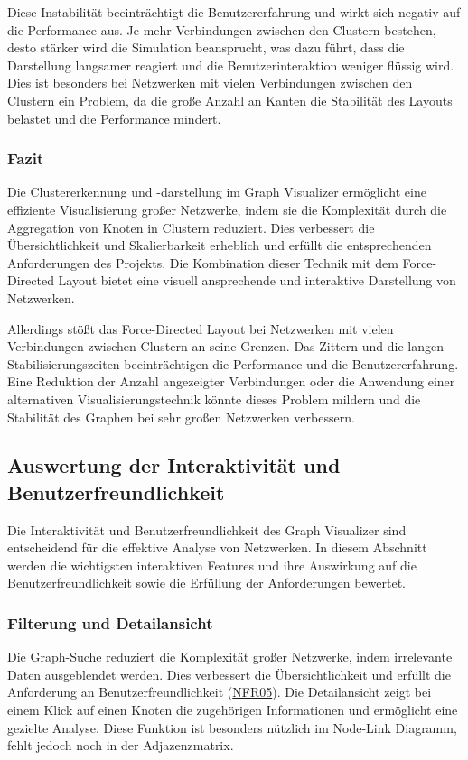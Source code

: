 Diese Instabilität beeinträchtigt die Benutzererfahrung und wirkt sich negativ auf die Performance aus. Je mehr Verbindungen zwischen den Clustern bestehen, desto stärker wird die Simulation beansprucht, was dazu führt, dass die Darstellung langsamer reagiert und die Benutzerinteraktion weniger flüssig wird. Dies ist besonders bei Netzwerken mit vielen Verbindungen zwischen den Clustern ein Problem, da die große Anzahl an Kanten die Stabilität des Layouts belastet und die Performance mindert.

\subsubsection{Fazit}

Die Clustererkennung und -darstellung im Graph Visualizer ermöglicht eine effiziente Visualisierung großer Netzwerke, indem sie die Komplexität durch die Aggregation von Knoten in Clustern reduziert. Dies verbessert die Übersichtlichkeit und Skalierbarkeit erheblich und erfüllt die entsprechenden Anforderungen des Projekts. Die Kombination dieser Technik mit dem Force-Directed Layout bietet eine visuell ansprechende und interaktive Darstellung von Netzwerken.

Allerdings stößt das Force-Directed Layout bei Netzwerken mit vielen Verbindungen zwischen Clustern an seine Grenzen. Das Zittern und die langen Stabilisierungszeiten beeinträchtigen die Performance und die Benutzererfahrung. Eine Reduktion der Anzahl angezeigter Verbindungen oder die Anwendung einer alternativen Visualisierungstechnik könnte dieses Problem mildern und die Stabilität des Graphen bei sehr großen Netzwerken verbessern.

\subsection{Auswertung der Interaktivität und Benutzerfreundlichkeit}

Die Interaktivität und Benutzerfreundlichkeit des Graph Visualizer sind entscheidend für die effektive Analyse von Netzwerken. In diesem Abschnitt werden die wichtigsten interaktiven Features und ihre Auswirkung auf die Benutzerfreundlichkeit sowie die Erfüllung der Anforderungen bewertet.

\subsubsection{Filterung und Detailansicht}

Die Graph-Suche reduziert die Komplexität großer Netzwerke, indem irrelevante Daten ausgeblendet werden. Dies verbessert die Übersichtlichkeit und erfüllt die Anforderung an Benutzerfreundlichkeit (\hyperref[NFR05]{NFR05}). Die Detailansicht zeigt bei einem Klick auf einen Knoten die zugehörigen Informationen und ermöglicht eine gezielte Analyse. Diese Funktion ist besonders nützlich im Node-Link Diagramm, fehlt jedoch noch in der Adjazenzmatrix.

